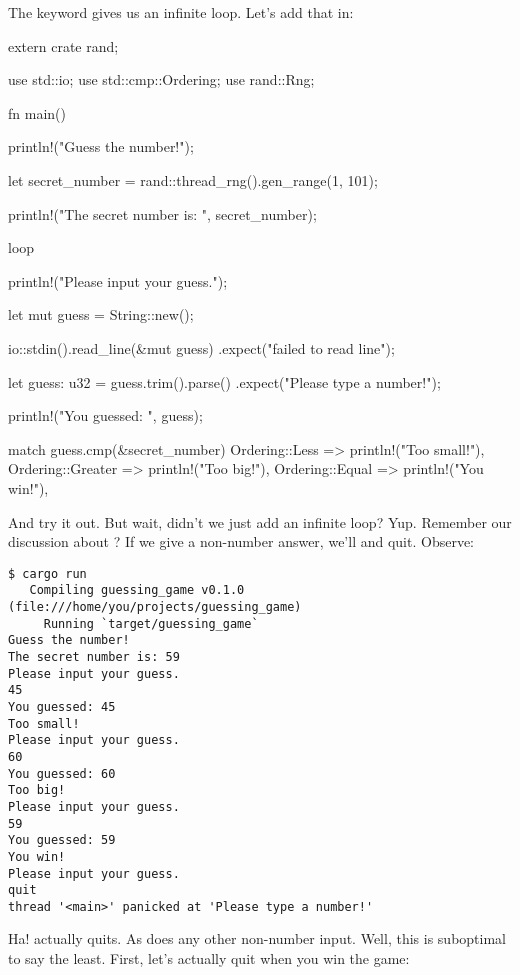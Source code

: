 The  keyword gives us an infinite loop. Let’s add that in:

\begin{rustc}
extern crate rand;

use std::io;
use std::cmp::Ordering;
use rand::Rng;

fn main() {
    println!("Guess the number!");

    let secret_number = rand::thread_rng().gen_range(1, 101);

    println!("The secret number is: {}", secret_number);

    loop {
        println!("Please input your guess.");

        let mut guess = String::new();

        io::stdin().read_line(&mut guess)
            .expect("failed to read line");

        let guess: u32 = guess.trim().parse()
            .expect("Please type a number!");

        println!("You guessed: {}", guess);

        match guess.cmp(&secret_number) {
            Ordering::Less    => println!("Too small!"),
            Ordering::Greater => println!("Too big!"),
            Ordering::Equal   => println!("You win!"),
        }
    }
}
\end{rustc}

And try it out. But wait, didn’t we just add an infinite loop? Yup. Remember our discussion about ? If we give a
non-number answer, we’ll  and quit. Observe:

\begin{verbatim}
$ cargo run
   Compiling guessing_game v0.1.0 (file:///home/you/projects/guessing_game)
     Running `target/guessing_game`
Guess the number!
The secret number is: 59
Please input your guess.
45
You guessed: 45
Too small!
Please input your guess.
60
You guessed: 60
Too big!
Please input your guess.
59
You guessed: 59
You win!
Please input your guess.
quit
thread '<main>' panicked at 'Please type a number!'
\end{verbatim}

Ha!  actually quits. As does any other non-number input. Well, this is suboptimal to say the least. First, 
let’s actually quit when you win the game:

